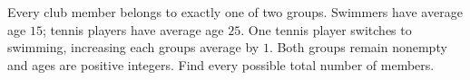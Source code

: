 Every club member belongs to exactly one of two groups. Swimmers have average age $15$; tennis players have average age $25$. One tennis player switches to swimming, increasing each group\textquotesingle s average by $1$. Both groups remain nonempty and ages are positive integers. Find every possible total number of members.
